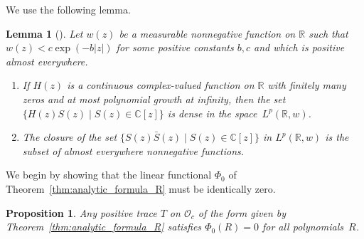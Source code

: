 \documentclass[pdftex]{sigma}
\newcommand\numbers{\textup{(\arabic*)}}
\newcommand\RR{\mathbb{R}}
\newcommand\CC{\mathbb{C}}
\newcommand\cO{\mathcal{O}}
\renewcommand\S{\bar{S}}
\numberwithin{equation}{section}
\newtheorem{Lemma}[Theorem]{Lemma}
\newtheorem{Proposition}[Theorem]{Proposition}
\theoremstyle{definition}
\begin{document}
We use the following lemma.

\begin{Lemma}[{\cite[Lemma~4.2]{etingof2021twisted}}]
 \label{lem:analytic}
 Let $w(z)$ be a measurable nonnegative function on $\RR$
 such that~${w(z) < c \exp(-b|z|)}$
 for some positive constants $b, c$
 and which is positive almost everywhere.
 \begin{enumerate}[label=\numbers]\itemsep=0pt
 \item If $H(z)$ is a continuous complex-valued function on $\RR$
 with finitely many zeros
 and at most polynomial growth at infinity,
 then the set~$\{ H(z) S(z) \mid S(z) \in \CC[z] \}$
 is dense in the space~$L^p (\RR, w)$.
 \item The closure of the set
 $\{ S(z) \S(z) \mid S(z) \in \CC[z] \}$
 in $L^p (\RR, w)$ is the subset
 of almost everywhere nonnegative functions.
 \end{enumerate}
\end{Lemma}

We begin by showing that the linear functional $\Phi_0$
of Theorem~\ref{thm:analytic_formula_R}
must be identically zero.

\begin{Proposition}
 \label{prop:phi_0}
 Any positive trace $T$ on $\cO_c$
 of the form given by Theorem~{\rm\ref{thm:analytic_formula_R}}
 satisfies ${\Phi_0 (R) = 0}$ for all polynomials~$R$.
\end{Proposition}
\end{document}
